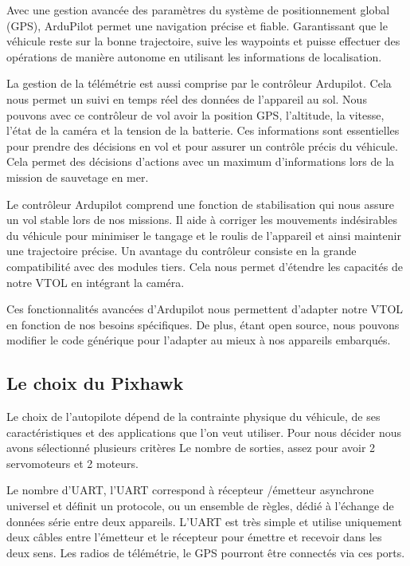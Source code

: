 \documentclass[a4paper,12pt,french]{report}
\begin{document}
Avec une gestion avancée des paramètres du système de positionnement global (GPS), ArduPilot permet une navigation précise et fiable. Garantissant que le véhicule reste sur la bonne trajectoire, suive les waypoints et puisse effectuer des opérations de manière autonome en utilisant les informations de localisation.\newline

La gestion de la télémétrie est aussi comprise par le contrôleur Ardupilot. Cela nous permet un suivi en temps réel des données de l’appareil au sol. Nous pouvons avec ce contrôleur de vol avoir la position GPS, l'altitude, la vitesse, l’état de la caméra et la tension de la batterie. Ces informations sont essentielles pour prendre des décisions en vol et pour assurer un contrôle précis du véhicule. Cela permet des décisions d’actions avec un maximum d’informations lors de la mission de sauvetage en mer.\newline

Le contrôleur Ardupilot comprend une fonction de stabilisation qui nous assure un vol stable lors de nos missions. Il aide à corriger les mouvements indésirables du véhicule pour minimiser le tangage et le roulis de l’appareil et ainsi maintenir une trajectoire précise.
Un avantage du contrôleur consiste en la grande compatibilité avec des modules tiers. Cela nous permet d’étendre les capacités de notre VTOL en intégrant la caméra.\newline

Ces fonctionnalités avancées d’Ardupilot nous permettent d’adapter notre VTOL en fonction de nos besoins spécifiques. De plus, étant open source, nous pouvons modifier le code générique pour l’adapter au mieux à nos appareils embarqués.

\subsection{Le choix du Pixhawk}

Le choix de l’autopilote dépend de la contrainte physique du véhicule, de ses caractéristiques et des applications que l’on veut utiliser.\newline
Pour nous décider nous avons sélectionné plusieurs critères
Le nombre de sorties, assez pour avoir 2 servomoteurs et 2 moteurs.\newline

Le nombre d'UART, l'UART correspond à récepteur /émetteur asynchrone universel et définit un protocole, ou un ensemble de règles, dédié à l'échange de données série entre deux appareils. L'UART est très simple et utilise uniquement deux câbles entre l'émetteur et le récepteur pour émettre et recevoir dans les deux sens. Les radios de télémétrie, le GPS pourront être connectés via ces ports.\newline
\end{document}
